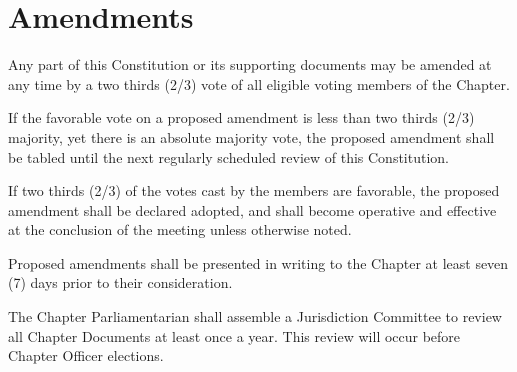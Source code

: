 \documentclass[11pt]{article}
\begin{document}
\section{Amendments}
\begin{legal}
  \item
    Any part of this Constitution or its supporting documents may be amended at any time by a two thirds (2/3) vote of all eligible voting members of the Chapter.
    \begin{legal}
      \item
        If the favorable vote on a proposed amendment is less than two thirds (2/3) majority, yet there is an absolute majority vote, the proposed amendment shall be tabled until the next regularly scheduled review of this Constitution.
      \item
        If two thirds (2/3) of the votes cast by the members are favorable, the proposed amendment shall be declared adopted, and shall become operative and effective at the conclusion of the meeting unless otherwise noted.
      \item
        Proposed amendments shall be presented in writing to the Chapter at least seven (7) days prior to their consideration.
      \item
        The Chapter Parliamentarian shall assemble a Jurisdiction Committee to review all Chapter Documents at least once a year. This review will occur before Chapter Officer elections.
    \end{legal}
\end{legal}
\end{document}
